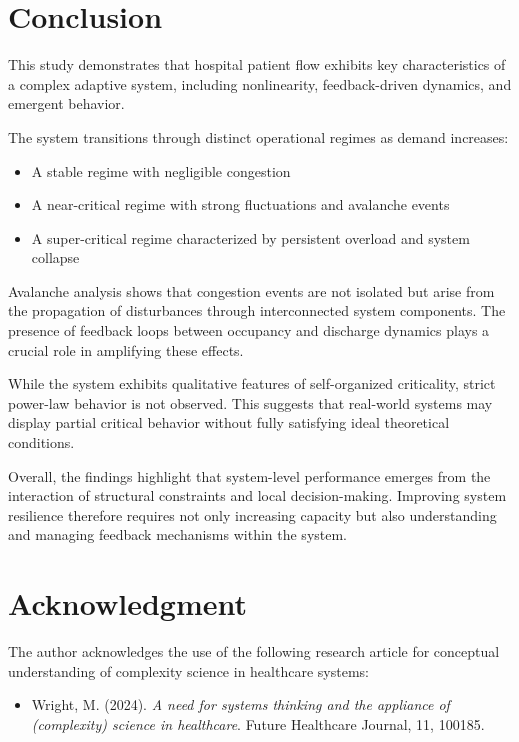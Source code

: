 \documentclass[11pt]{article}
\begin{document}
\section{Conclusion}

This study demonstrates that hospital patient flow exhibits key characteristics of a complex adaptive system, including nonlinearity, feedback-driven dynamics, and emergent behavior.

The system transitions through distinct operational regimes as demand increases:
\begin{itemize}
\item A stable regime with negligible congestion
\item A near-critical regime with strong fluctuations and avalanche events
\item A super-critical regime characterized by persistent overload and system collapse
\end{itemize}

Avalanche analysis shows that congestion events are not isolated but arise from the propagation of disturbances through interconnected system components. The presence of feedback loops between occupancy and discharge dynamics plays a crucial role in amplifying these effects.

While the system exhibits qualitative features of self-organized criticality, strict power-law behavior is not observed. This suggests that real-world systems may display partial critical behavior without fully satisfying ideal theoretical conditions.

Overall, the findings highlight that system-level performance emerges from the interaction of structural constraints and local decision-making. Improving system resilience therefore requires not only increasing capacity but also understanding and managing feedback mechanisms within the system.

\section*{Acknowledgment}

The author acknowledges the use of the following research article for conceptual understanding of complexity science in healthcare systems:

\begin{itemize}
\item Wright, M. (2024). \textit{A need for systems thinking and the appliance of (complexity) science in healthcare}. Future Healthcare Journal, 11, 100185.
\end{itemize}
\end{document}

